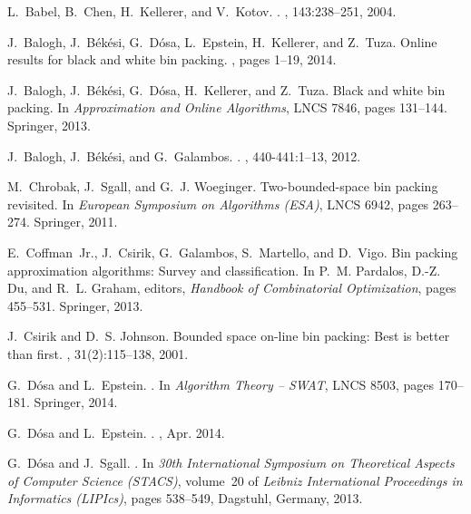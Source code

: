\documentclass[11pt,a4paper]{article}
\begin{document}
{\small

\begin{thebibliography}{10}
\setlength\itemsep{0pt}

L.~Babel, B.~Chen, H.~Kellerer, and V.~Kotov.
.
, 143:238--251, 2004.

J.~Balogh, J.~B\'{e}k\'{e}si, G.~D\'{o}sa, L.~Epstein, H.~Kellerer, and
  Z.~Tuza.
\newblock Online results for black and white bin packing.
, pages 1--19, 2014.

J.~Balogh, J.~B\'{e}k\'{e}si, G.~D\'{o}sa, H.~Kellerer, and Z.~Tuza.
\newblock Black and white bin packing.
\newblock In {\em Approximation and Online Algorithms}, LNCS 7846, pages 131--144. Springer, 2013.

J.~Balogh, J.~B\'{e}k\'{e}si, and G.~Galambos.
.
, 440-441:1--13, 2012.

M.~Chrobak, J.~Sgall, and G.~J. Woeginger.
\newblock Two-bounded-space bin packing revisited.
\newblock In {\em European Symposium on Algorithms (ESA)}, LNCS 6942, pages
  263--274. Springer, 2011.

E.~Coffman~Jr., J.~Csirik, G.~Galambos, S.~Martello, and D.~Vigo.
\newblock Bin packing approximation algorithms: Survey and classification.
\newblock In P.~M. Pardalos, D.-Z. Du, and R.~L. Graham, editors, {\em Handbook
  of Combinatorial Optimization}, pages 455--531. Springer, 2013.

J.~Csirik and D.~S. Johnson.
\newblock Bounded space on-line bin packing: Best is better than first.
, 31(2):115--138, 2001.

G.~D\'{o}sa and L.~Epstein.
.
\newblock In {\em Algorithm Theory – SWAT}, LNCS 8503, pages 170--181.
   Springer, 2014.

G.~D\'{o}sa and L.~Epstein.
.
, Apr. 2014.

G.~D\'{o}sa and J.~Sgall.
.
\newblock In {\em 30th International
  Symposium on Theoretical Aspects of Computer Science (STACS)}, volume~20
  of {\em Leibniz International Proceedings in Informatics (LIPIcs)}, pages
  538--549, Dagstuhl, Germany, 2013. 


\end{thebibliography}}
\end{document}
